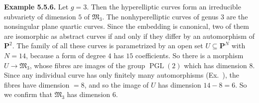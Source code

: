 {\medskip
\noindent\hypertarget{result-IV-5.5.6}{}\textbf{Example 5.5.6.} Let $g=3$. Then the hyperelliptic curves form an irreducible subvariety of dimension $5$ of $\mathfrak M_3$. The nonhyperelliptic curves of genus $3$ are the nonsingular plane quartic curves. Since the embedding is canonical, two of them are isomorphic as abstract curves if and only if they differ by an automorphism of $\mathbf P^2$. The family of all these curves is parametrized by an open set $U\subseteq\mathbf P^N$ with $N=14$, because a form of degree $4$ has $15$ coefficients. So there is a morphism $U\to\mathfrak M_3$, whose fibres are images of the group $\operatorname{PGL}(2)$ which has dimension $8$. Since any individual curve has only finitely many automorphisms (Ex.~), the fibres have dimension $=8$, and so the image of $U$ has dimension $14-8=6$. So we confirm that $\mathfrak M_3$ has dimension $6$.}
